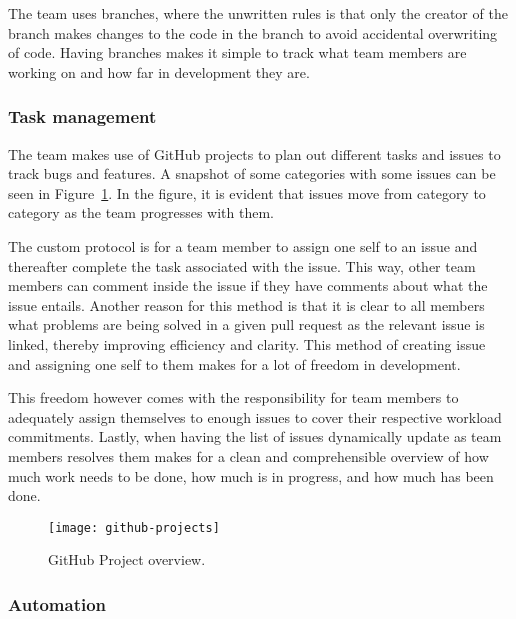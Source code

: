 The team uses branches, where the unwritten rules is that only the creator of the branch makes changes to the code in
the branch to avoid accidental overwriting of code.
Having branches makes it simple to track what team members are working on and how far in development they are.

\subsubsection{Task management}

The team makes use of GitHub projects to plan out different tasks and issues to track bugs and features.
A snapshot of some categories with some issues can be seen in Figure~\ref{fig:github-project}.
In the figure, it is evident that issues move from category to category as the team progresses with them.

The custom protocol is for a team member to assign one self to an issue and thereafter complete the task associated with
the issue.
This way, other team members can comment inside the issue if they have comments about what the issue entails.
Another reason for this method is that it is clear to all members what problems are being solved in a given pull request
as the relevant issue is linked, thereby improving efficiency and clarity.
This method of creating issue and assigning one self to them makes for a lot of freedom in development.

This freedom however comes with the responsibility for team members to adequately assign themselves to enough issues to
cover their respective workload commitments.
Lastly, when having the list of issues dynamically update as team members resolves them makes for a clean and
comprehensible overview of how much work needs to be done, how much is in progress, and how much has been done.

\begin{figure}[htb]
    \centering
    \texttt{[image: github-projects]}
    \caption{GitHub Project overview.}\label{fig:github-project}
\end{figure}


\subsubsection{Automation}

